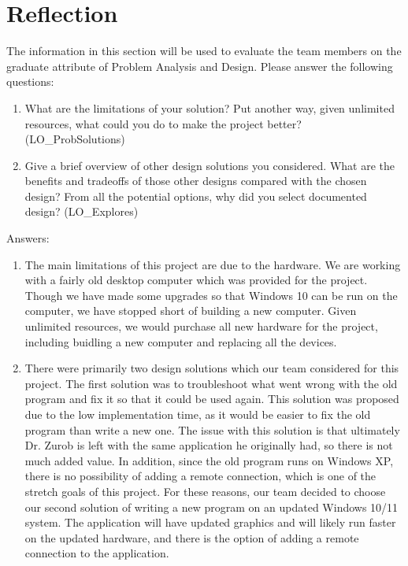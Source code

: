 \documentclass[12pt, titlepage]{article}
\begin{document}
\section{Reflection}

The information in this section will be used to evaluate the team members on the
graduate attribute of Problem Analysis and Design.  Please answer the following questions:

\begin{enumerate}
  \item What are the limitations of your solution?  Put another way, given
  unlimited resources, what could you do to make the project better? (LO\_ProbSolutions)
  \item Give a brief overview of other design solutions you considered.  What
  are the benefits and tradeoffs of those other designs compared with the chosen
  design?  From all the potential options, why did you select documented design?
  (LO\_Explores)
\end{enumerate}

Answers:
\begin{enumerate}
	\item The main limitations of this project are due to the hardware. We are working with a fairly old desktop computer which was provided for the project. Though we have made some upgrades so that Windows 10 can be run on the computer, we have stopped short of building a new computer. Given unlimited resources, we would purchase all new hardware for the project, including buidling a new computer and replacing all the devices. 
	\item There were primarily two design solutions which our team considered for this project. The first solution was to troubleshoot what went wrong with the old program and fix it so that it could be used again. This solution was proposed due to the low implementation time, as it would be easier to fix the old program than write a new one. The issue with this solution is that ultimately Dr. Zurob is left with the same application he originally had, so there is not much added value. In addition, since the old program runs on Windows XP, there is no possibility of adding a remote connection, which is one of the stretch goals of this project. For these reasons, our team decided to choose our second solution of writing a new program on an updated Windows 10/11 system. The application will have updated graphics and will likely run faster on the updated hardware, and there is the option of adding a remote connection to the application. 
\end{enumerate}
\end{document}

